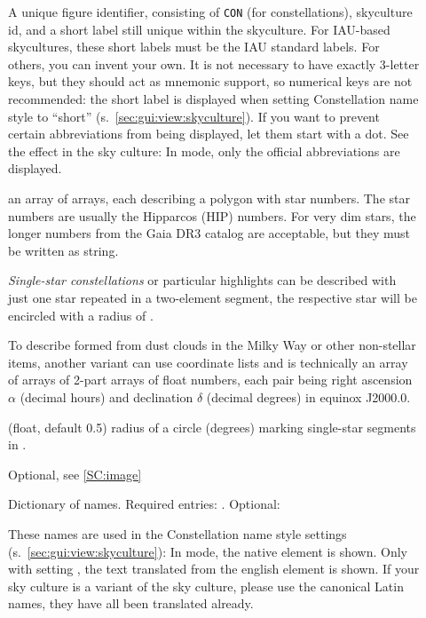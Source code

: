 \begin{description}
\item[] A unique figure identifier, consisting of \texttt{CON} (for constellations), skyculture id, and a short label still unique within the skyculture.
                 For IAU-based skycultures, these short labels must be the IAU standard labels. For others, you can invent your own. It is not necessary to have exactly
                 3-letter keys, but they should act as mnemonic support, so numerical keys are not recommended:  
				 the short label is displayed when setting Constellation name style to ``short'' (s.~\ref{sec:gui:view:skyculture}). If you want to prevent
				 certain abbreviations from being displayed, let them start with a dot. See the effect in the  sky culture: In
				  mode, only the official abbreviations are displayed.
				 
				 
\item[] an array of arrays, each describing a polygon with star numbers. The star numbers are usually the Hipparcos (HIP) numbers. 
                    For very dim stars, the longer numbers from the Gaia DR3 catalog are acceptable, but they must be written as string.
					
					\emph{Single-star constellations}  or particular highlights can be described with just one star repeated in a two-element segment,
					the respective star will be encircled with a radius of .
					
					To describe  formed from dust clouds in the Milky Way or other non-stellar items, 
					another variant can use coordinate lists and is technically an array of arrays of 2-part arrays of float numbers, 
					each pair being right ascension $\alpha$ (decimal hours) and declination $\delta$ (decimal degrees) in equinox J2000.0. 
\item[] (float, default 0.5)  radius of a circle (degrees) marking single-star segments in .
\item[] Optional, see \ref{SC:image}
\item[] Dictionary of names. Required entries: . Optional: 

	These names are used in the Constellation name style settings (s.~\ref{sec:gui:view:skyculture}): In  mode, the native element is shown. 
	Only with setting , the text translated from the english element is shown. If your sky culture is a variant of the 
	sky culture, please use the canonical Latin names, they have all been translated already.


\end{description}
